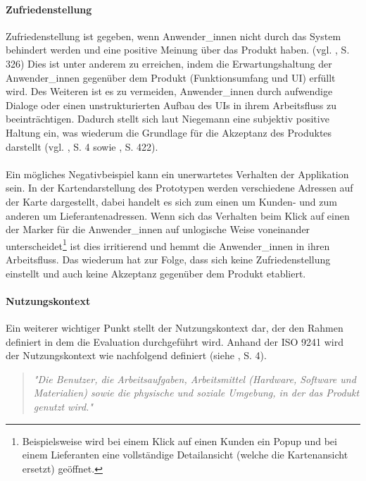 \documentclass[Bachelorarbeit.tex]{subfiles}
\begin{document}
\paragraph{Zufriedenstellung}
Zufriedenstellung ist gegeben, wenn Anwender\_innen nicht durch das System behindert werden und eine positive Meinung über das Produkt haben. (vgl. \cite{Burmester}, S. 326)
Dies ist unter anderem zu erreichen, indem die Erwartungshaltung der Anwender\_innen gegenüber dem Produkt (Funktionsumfang und \ac{UI}) erfüllt wird.
Des Weiteren ist es zu vermeiden, Anwender\_innen durch aufwendige Dialoge oder einen unstrukturierten Aufbau des \ac{UI}s in ihrem Arbeitsfluss zu beeinträchtigen.
Dadurch stellt sich laut Niegemann eine subjektiv positive Haltung ein, was wiederum die Grundlage für die Akzeptanz des Produktes darstellt (vgl. \cite{Iso9241_11}, S. 4 sowie \cite{Niegemann2008}, S. 422).\\
\\
Ein mögliches Negativbeispiel kann ein unerwartetes Verhalten der Applikation sein.
In der Kartendarstellung des Prototypen werden verschiedene Adressen auf der Karte dargestellt, dabei handelt es sich zum einen um Kunden- und zum anderen um Lieferantenadressen. 
Wenn sich das Verhalten beim Klick auf einen der Marker für die Anwender\_innen auf unlogische Weise voneinander  unterscheidet\footnote{Beispielsweise wird bei einem Klick auf einen Kunden ein Popup und bei einem Lieferanten eine vollständige Detailansicht (welche die Kartenansicht ersetzt) geöffnet.} ist dies irritierend und hemmt die Anwender\_innen in ihren Arbeitsfluss.
Das wiederum hat zur Folge, dass sich keine Zufriedenstellung einstellt und auch keine Akzeptanz gegenüber dem Produkt etabliert.


\paragraph{Nutzungskontext}

Ein weiterer wichtiger Punkt stellt der Nutzungskontext dar, der den Rahmen definiert in dem die Evaluation durchgeführt wird.
Anhand der ISO 9241 wird der Nutzungskontext wie nachfolgend definiert (siehe \cite{Iso9241_11}, S. 4). 

\begin{quote}
\textit{"Die Benutzer, die Arbeitsaufgaben, Arbeitsmittel (Hardware, Software und Materialien) sowie die physische und soziale Umgebung, in der das Produkt genutzt wird."}
\end{quote} 
\end{document}
